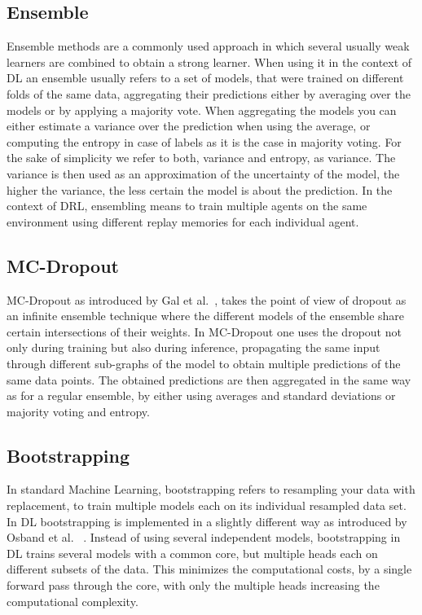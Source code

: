 \documentclass[11pt,a4paper]{article}
\begin{document}
	\subsection{Ensemble}\label{subsec:ensemble}
	Ensemble methods are a commonly used approach in which several usually weak learners are combined to obtain a strong learner. %
	When using it in the context of DL an ensemble usually refers to a set of models, that were trained on different folds of the same data, aggregating their predictions either by averaging over the models or by applying a majority vote.
	When aggregating the models you can either estimate a variance over the prediction when using the average, or computing the entropy in case of labels as it is the case in majority voting.
	For the sake of simplicity we refer to both, variance and entropy, as variance. %
	The variance is then used as an approximation of the uncertainty of the model, the higher the variance, the less certain the model is about the prediction.
	In the context of DRL, ensembling means to train multiple agents on the same environment using different replay memories for each individual agent.\\

	\subsection{MC-Dropout}\label{subsec:mc-dropout}
	MC-Dropout as introduced by Gal et al.~\cite{gal_dropout_2016}, takes the point of view of dropout as an infinite ensemble technique where the different models of the ensemble share certain intersections of their weights.
	In MC-Dropout one uses the dropout not only during training but also during inference, propagating the same input through different sub-graphs of the model to obtain multiple predictions of the same data points.
	The obtained predictions are then aggregated in the same way as for a regular ensemble, by either using averages and standard deviations or majority voting and entropy.\\

	\subsection{Bootstrapping}\label{subsec:bootstrapping}
	In standard Machine Learning, bootstrapping refers to resampling your data with replacement, to train multiple models each on its individual resampled data set.
	In DL bootstrapping is implemented in a slightly different way as introduced by Osband et al.
	~\cite{osband_deep_2016}.
	Instead of using several independent models, bootstrapping in DL trains several models with a common core, but multiple heads each on different subsets of the data.
	This minimizes the computational costs, by a single forward pass through the core, with only the multiple heads increasing the computational complexity.\\
\end{document}
